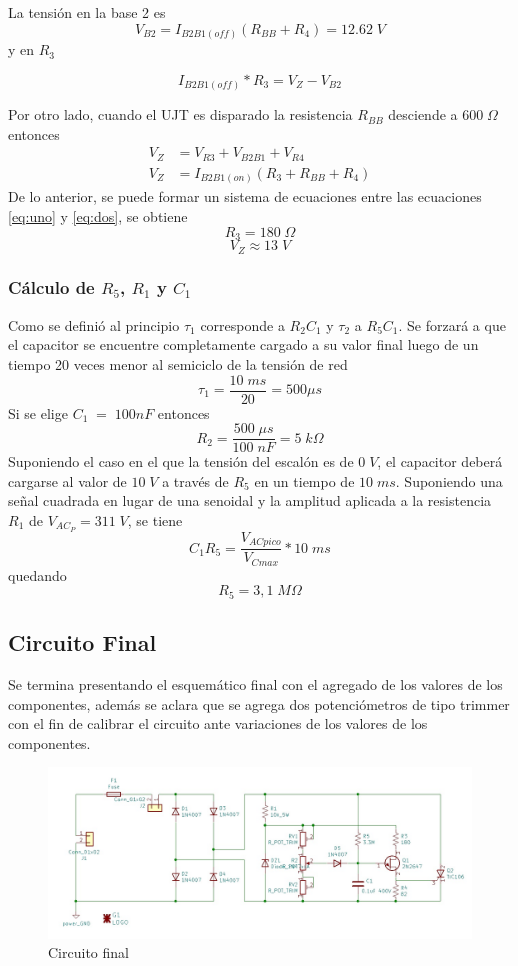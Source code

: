 \documentclass{article}
\begin{document}
La tensión en la base 2 es
\[ V_{B2} = I_{B2B1(off)} (R_{BB} + R_4) = 12.62 \; V \]
y en $R_3$

\begin{equation}
I_{B2B1(off)} * R_3 = V_Z - V_{B2}  \label{eq:uno}
\end{equation}

Por otro lado, cuando el UJT es disparado la resistencia $R_{BB}$ desciende a $600 \; \Omega$ entonces
\begin{align}
V_Z &= V_{R3} + V_{B2B1} + V_{R4} \nonumber \\
V_Z &= I_{B2B1(on)} (R_3 + R_{BB} + R_4) \label{eq:dos}
\end{align}
%
De lo anterior, se puede formar un sistema de ecuaciones entre las ecuaciones \ref{eq:uno} y \ref{eq:dos}, se obtiene
\[ R_3 = 180 \; \Omega \]
\[ V_Z \approx 13 \; V\]
%
\subsubsection{Cálculo de $R_5$, $R_1$ y $C_1$}
Como se definió al principio $\tau_1$ corresponde a $R_2C_1$ y $\tau_2$ a $R_5C_1$. Se forzará a que el capacitor se encuentre completamente cargado a su valor final luego de un tiempo 20 veces menor al semiciclo de la tensión de red
\[ \tau_1 = \frac{10 \; ms}{20} = 500 \mu s \]
Si se elige $C_1 \; = \; 100nF$ entonces
\[ R_2 = \frac{500 \; \mu s}{100 \; nF} = 5 \; k \Omega \]
Suponiendo el caso en el que la tensión del escalón es de $0 \; V$, el capacitor deberá cargarse al valor de $10 \; V$ a través de $R_5$ en un tiempo de $10 \; ms$. Suponiendo una señal cuadrada en lugar de una senoidal y la amplitud aplicada a la resistencia $R_1$ de $V_{AC_P} = 311 \; V $, se tiene 
%
\[ C_1R_5 = \frac{V_{ACpico}}{V_{C max}} * 10 \; ms \]
quedando
\[ R_5 = 3,1 \; M \Omega \]

\subsection{Circuito Final}
Se termina presentando el esquemático final con el agregado de los valores de los componentes, además se aclara que se agrega dos potenciómetros de tipo trimmer con el fin de calibrar el circuito ante variaciones de los valores de los componentes.
\begin{figure}[h]
 \begin{center}
	\includegraphics[width=\textwidth]{imagenes/fig5.jpg} 
	\caption{Circuito final}\label{fig:fig5}
 \end{center}
\end{figure}
\end{document}
